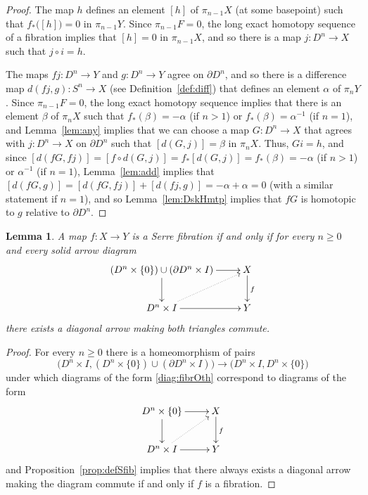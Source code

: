 \documentclass[12pt]{amsart}
\numberwithin{equation}{section}
\theoremstyle{slplain}
\newtheorem{lem}[equation]{Lemma}
\theoremstyle{definition}
\theoremstyle{remark}
\newcommand{\propref}{Proposition~\ref}
\newcommand{\lemref}{Lemma~\ref}
\newcommand{\defref}{Definition~\ref}
\newcommand{\bdry}{\partial}
\begin{document}
\begin{proof}
  The map $h$ defines an element $[h]$ of $\pi_{n-1}X$ (at some
  basepoint) such that $f_{*}\bigl([h]\bigr) = 0$ in $\pi_{n-1}Y$.
  Since $\pi_{n-1}F = 0$, the long exact homotopy sequence of a
  fibration implies that $[h] = 0$ in $\pi_{n-1}X$, and so there is a
  map $j\colon D^{n} \to X$ such that $j\circ i = h$.

  The maps $fj\colon D^{n} \to Y$ and $g\colon D^{n} \to Y$ agree on
  $\partial D^{n}$, and so there is a difference map $d(fj,g)\colon
  S^{n} \to X$ (see \defref{def:diff}) that defines an element
  $\alpha$ of $\pi_{n}Y$.  Since $\pi_{n-1}F = 0$, the long exact
  homotopy sequence implies that there is an element $\beta$ of
  $\pi_{n}X$ such that $f_{*}(\beta) = -\alpha$ (if $n>1$) or
  $f_{*}(\beta) = \alpha^{-1}$ (if $n=1$), and \lemref{lem:any}
  implies that we can choose a map $G\colon D^{n} \to X$ that agrees
  with $j\colon D^{n} \to X$ on $\partial D^{n}$ such that $[d(G,j)] =
  \beta$ in $\pi_{n}X$.  Thus, $Gi = h$, and since $[d(fG, fj)] =
  [f\circ d(G,j)] = f_{*}[d(G,j)] = f_{*}(\beta) = -\alpha$ (if $n>1$)
  or $\alpha^{-1}$ (if $n=1$), \lemref{lem:add} implies that
  $[d(fG,g)] = [d(fG,fj)] + [d(fj,g)] = -\alpha + \alpha = 0$ (with a
  similar statement if $n=1$), and so \lemref{lem:DskHmtp} implies
  that $fG$ is homotopic to $g$ relative to $\bdry D^{n}$.
\end{proof}


\begin{lem}
  \label{lem:fibr}
  A map $f\colon X \to Y$ is a Serre fibration if and only if for
  every $n \ge 0$ and every solid arrow diagram
  \begin{equation}
    \label{diag:fibrOth}
    \vcenter{
      \xymatrix{
        {(D^{n}\times\{0\}) \cup (\partial D^{n}\times I)}
        \ar[r] \ar[d]
        & {X} \ar[d]^{f}\\
        {D^{n}\times I} \ar[r] \ar@{..>}[ur]
        & {Y}
      }%
    }%
  \end{equation}
  there exists a diagonal arrow making both triangles commute.
\end{lem}

\begin{proof}
  For every $n \ge 0$ there is a homeomorphism of pairs
  \begin{displaymath}
    \bigl(D^{n}\times I, (D^{n}\times\{0\}) \cup
    (\partial D^{n}\times I)\bigr)
    \longrightarrow
    \bigl(D^{n}\times I, D^{n}\times\{0\}\bigr)
  \end{displaymath}
  under which diagrams of the form \eqref{diag:fibrOth} correspond to
  diagrams of the form
  \begin{displaymath}
    \xymatrix{
      {D^{n}\times \{0\}} \ar[r] \ar[d]
      & {X} \ar[d]^{f}\\
      {D^{n}\times I} \ar[r] \ar@{..>}[ur]
      & {Y}
    }
  \end{displaymath}
  and \propref{prop:defSfib} implies that there always exists a
  diagonal arrow making the diagram commute if and only if $f$ is a
  fibration.
\end{proof}
\end{document}

